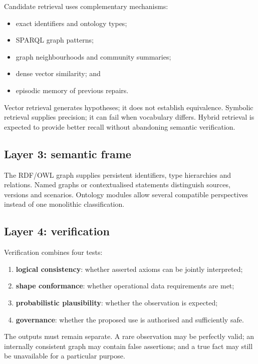 \documentclass[11pt,a4paper]{article}
\begin{document}
Candidate retrieval uses complementary mechanisms:

\begin{itemize}
  \item exact identifiers and ontology types;
  \item SPARQL graph patterns;
  \item graph neighbourhoods and community summaries;
  \item dense vector similarity; and
  \item episodic memory of previous repairs.
\end{itemize}

Vector retrieval generates hypotheses; it does not establish equivalence.
Symbolic retrieval supplies precision; it can fail when vocabulary differs.
Hybrid retrieval is expected to provide better recall without abandoning
semantic verification.

\subsection{Layer 3: semantic frame}

The RDF/OWL graph supplies persistent identifiers, type hierarchies and
relations. Named graphs or contextualised statements distinguish sources,
versions and scenarios. Ontology modules allow several compatible perspectives
instead of one monolithic classification.

\subsection{Layer 4: verification}

Verification combines four tests:

\begin{enumerate}
  \item \textbf{logical consistency}: whether asserted axioms can be jointly interpreted;
  \item \textbf{shape conformance}: whether operational data requirements are met;
  \item \textbf{probabilistic plausibility}: whether the observation is expected;
  \item \textbf{governance}: whether the proposed use is authorised and sufficiently safe.
\end{enumerate}

The outputs must remain separate. A rare observation may be perfectly valid;
an internally consistent graph may contain false assertions; and a true fact may
still be unavailable for a particular purpose.
\end{document}
